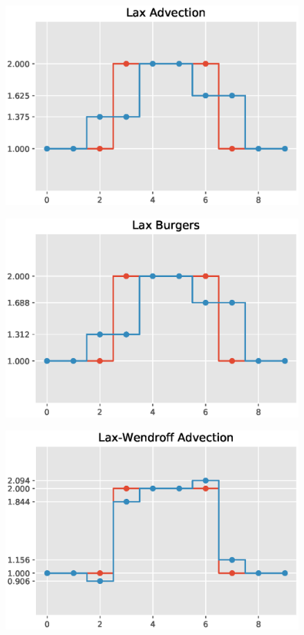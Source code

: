 \documentclass{article}
\begin{document}
\begin{figure}[H]
  \centering
  \includegraphics[width=1\linewidth]{pics/LAXadvection.eps}
  \label{fig:perf}
 \end{figure}

\begin{figure}[H]
  \centering
  \includegraphics[width=1\linewidth]{pics/LAXburger.eps}
  \label{fig:perf}
 \end{figure}

 \begin{figure}[H]
  \centering
  \includegraphics[width=1\linewidth]{pics/Wendroffadvection.eps}
  \label{fig:perf}
  \end{figure}
\end{document}
